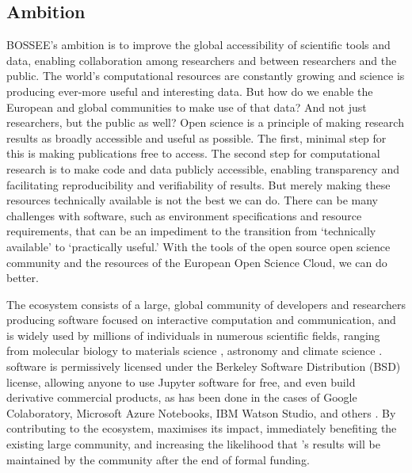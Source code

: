 
\subsection{Ambition}



BOSSEE's ambition is to improve the global accessibility of scientific tools and data,
enabling collaboration among researchers and between researchers and the public.
The world's computational resources are constantly growing and science is producing ever-more
useful and interesting data.
But how do we enable the European and global communities to make use of that data?
And not just researchers, but the public as well?
Open science is a principle of making research results as broadly accessible and useful as possible.
The first, minimal step for this is making publications free to access.
The second step for computational research is to make code and data publicly accessible,
enabling transparency and facilitating reproducibility and verifiability of results.
But merely making these resources technically available is not the best we can do.
There can be many challenges with software,
such as environment specifications and resource requirements,
that can be an impediment to the transition from `technically available' to `practically useful.'
With the tools of the open source open science community
and the resources of the European Open Science Cloud, we can do better.

The \Jupyter ecosystem consists of a large, global community of developers and researchers producing software
focused on interactive computation and communication,
and is widely used by millions of individuals in numerous scientific fields,
ranging from molecular biology \cite{Wang2016} to materials science \cite{Hughes2014},
astronomy \cite{Baron2017} and climate science \cite{Laken2015,Laken2015b}.
\Jupyter software is permissively licensed under the Berkeley Software Distribution (BSD)
license, allowing anyone to use Jupyter software for free,
and even build derivative commercial products,
as has been done in the cases of Google Colaboratory,
Microsoft Azure Notebooks,
IBM Watson Studio, and others .
By contributing to the \Jupyter ecosystem, \TheProject maximises its impact, immediately benefiting the existing large \Jupyter community,
and increasing the likelihood that \TheProject's results will be maintained by the community after the end of formal funding.


